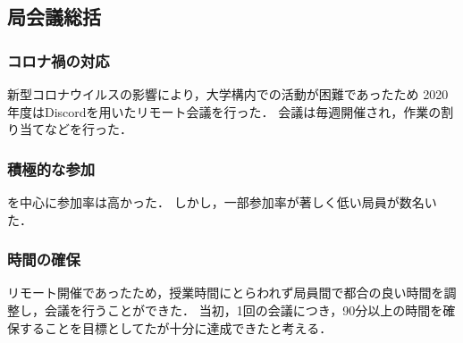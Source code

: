 \subsection*{局会議総括}

\subsubsection*{コロナ禍の対応}

新型コロナウイルスの影響により，大学構内での活動が困難であったため
2020年度はDiscordを用いたリモート会議を行った．
会議は毎週開催され，作業の割り当てなどを行った．

\subsubsection*{積極的な参加}

\secondGrade{}を中心に参加率は高かった．
しかし，一部参加率が著しく低い局員が数名いた．

\subsubsection*{時間の確保}

リモート開催であったため，授業時間にとらわれず局員間で都合の良い時間を調整し，会議を行うことができた．
当初，1回の会議につき，90分以上の時間を確保することを目標としてたが十分に達成できたと考える．
